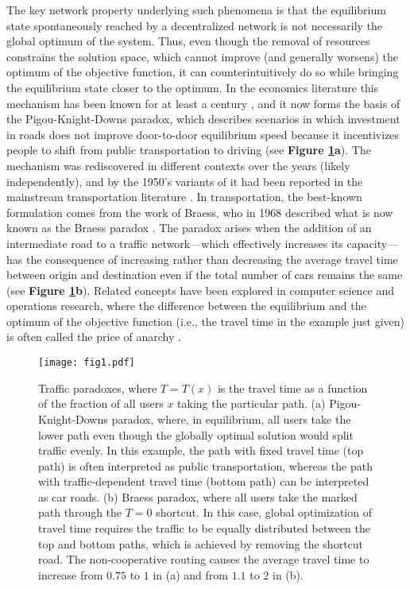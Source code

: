 \documentclass[
preprint,
superscriptaddress,
aps,
prl,
]{revtex4-1}
\begin{document}
The key network property underlying such phenomena is that the equilibrium state spontaneously reached by a decentralized network is not necessarily the global 
{\color{black} optimum}
of the system. Thus, even though the removal of resources 
constrains the solution
space, which cannot improve (and generally 
 {\color{black} worsens)}
the optimum of the objective function, it can counterintuitively do so while bringing the equilibrium state closer to the optimum. 
In the economics literature this mechanism has been known for at least a century \cite{pigou1932economics}, and it now forms the basis of the Pigou-Knight-Downs paradox, which describes scenarios  in which investment in roads does not improve door-to-door equilibrium speed because it incentivizes people to shift from public transportation to driving (see \textbf{Figure \ref{fig1}a}).
The mechanism was 
rediscovered in different contexts over the years (likely independently),
and by the 1950's variants of it had been reported in the mainstream transportation literature {\color{black} \cite{wardrop1952road,beckmann1956studies}.} In transportation, the best-known formulation comes from the work of Braess, who in 1968 described what is now known as the Braess paradox 
\cite{Braess1969, braess2005paradox}.  
{\color{black}
The paradox arises when}
 the addition of 
 an intermediate road to a traffic network---which effectively increases
 its   
 capacity---has the consequence of increasing rather than decreasing
 the average travel time between origin and destination even if the total number of cars remains the same  (see \textbf{Figure \ref{fig1}b}). Related concepts have been explored in computer science and operations research, where the difference between the equilibrium and the optimum of the objective function (i.e., the travel time in the example just given) is often called the price of anarchy \cite{roughgarden2005selfish}. 
 

 \begin{figure}[h]  
\texttt{[image: fig1.pdf]}
\caption{Traffic  paradoxes, where $T=T(x)$ is the travel time as a function of the fraction of all users $x$ taking the particular path.
(a) Pigou-Knight-Downs paradox, 
 where, in equilibrium,
 all users take the lower path even though the 
 globally optimal solution would split traffic evenly.
In this example, the path with fixed travel time (top path) is often interpreted as public transportation, whereas the path with traffic-dependent  travel  time (bottom path) can be interpreted as car roads. 
(b) Braess paradox, where all users take the marked path through the $T=0$ shortcut. In this case, global optimization of travel time requires the traffic to be equally 
distributed between the top and bottom paths, which is achieved by removing the shortcut road.
The non-cooperative routing causes the average travel time  to increase from  $0.75$ to $1$ in (a) and from $1.1$ to $2$ in (b).}
\label{fig1}
\end{figure}
\end{document}

